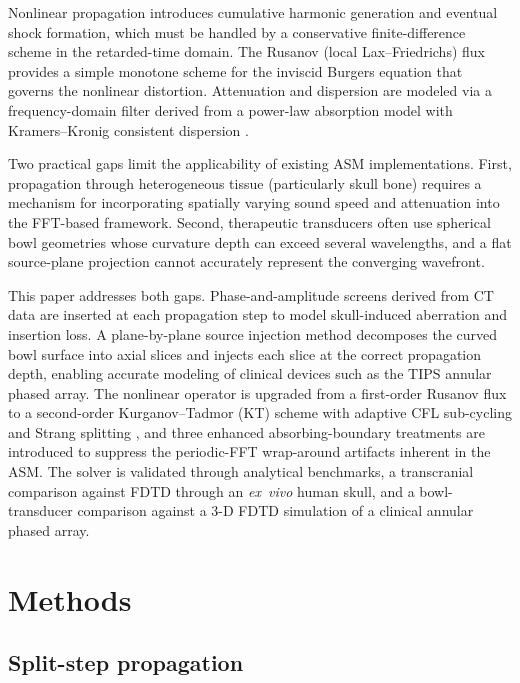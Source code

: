 \documentclass[11pt]{article}
\begin{document}
Nonlinear propagation introduces cumulative harmonic generation and
eventual shock formation, which must be handled by a conservative
finite-difference scheme in the retarded-time domain.  The Rusanov
(local Lax--Friedrichs) flux \cite{rusanov1962} provides a simple
monotone scheme for the inviscid Burgers equation that governs the
nonlinear distortion.  Attenuation and dispersion are modeled via a
frequency-domain filter derived from a power-law absorption model with
Kramers--Kronig consistent dispersion \cite{pinton2009,treeby2012}.

Two practical gaps limit the applicability of existing ASM
implementations.  First, propagation through heterogeneous tissue
(particularly skull bone) requires a mechanism for incorporating
spatially varying sound speed and attenuation into the FFT-based
framework.  Second, therapeutic transducers often use spherical bowl
geometries whose curvature depth can exceed several wavelengths, and a
flat source-plane projection cannot accurately represent the
converging wavefront.

This paper addresses both gaps.  Phase-and-amplitude screens derived
from CT data are inserted at each propagation step to model
skull-induced aberration and insertion loss.  A plane-by-plane source
injection method decomposes the curved bowl surface into axial slices
and injects each slice at the correct propagation depth, enabling
accurate modeling of clinical devices such as the TIPS annular phased
array.  The nonlinear operator is upgraded from a first-order Rusanov
flux to a second-order Kurganov--Tadmor (KT) scheme \cite{kurganov2000}
with adaptive CFL sub-cycling and Strang splitting \cite{strang1968},
and three enhanced absorbing-boundary treatments are introduced
to suppress the periodic-FFT wrap-around artifacts inherent in the ASM.
The solver is validated through analytical benchmarks, a transcranial
comparison against FDTD through an \emph{ex~vivo} human skull, and a
bowl-transducer comparison against a 3-D FDTD simulation of a
clinical annular phased array.

\section{Methods}
\label{sec:methods}

\subsection{Split-step propagation}
\end{document}
